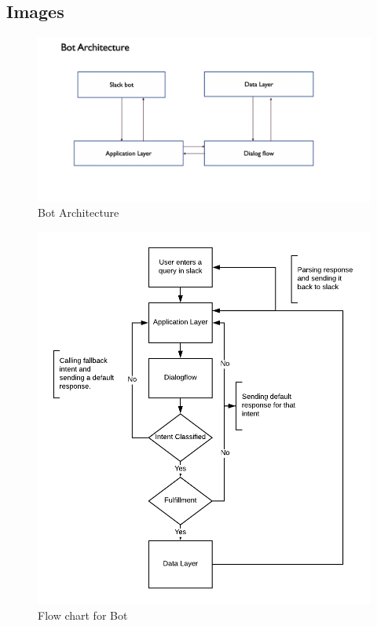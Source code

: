 \documentclass[12pt]{article}
\begin{document}
\subsection{Images}
\begin{figure}[H]
\centering
\includegraphics[scale = 0.5]{architecture.png}
\caption{Bot Architecture}
\label{fig:arch}
\end{figure}

\begin{figure}[H]
\centering
\includegraphics[scale = 0.5]{botflowchart.png}
\caption{Flow chart for Bot}
\label{fig:bot}
\end{figure}
\end{document}
